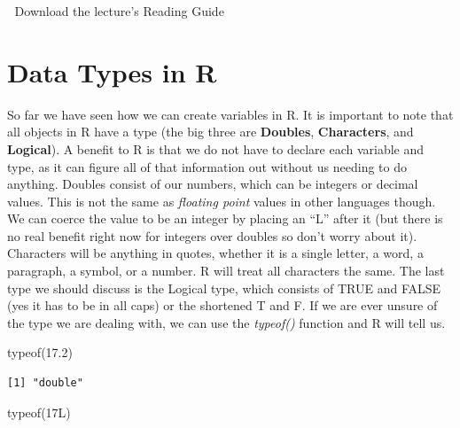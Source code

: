 \documentclass[
  letterpaper,
  DIV=11,
  numbers=noendperiod]{scrreprt}
\newenvironment{Shaded}{\begin{snugshade}}{\end{snugshade}}
\newcommand{\DecValTok}[1]{\textcolor[rgb]{0.68,0.00,0.00}{#1}}
\newcommand{\FloatTok}[1]{\textcolor[rgb]{0.68,0.00,0.00}{#1}}
\newcommand{\FunctionTok}[1]{\textcolor[rgb]{0.28,0.35,0.67}{#1}}
\newcommand{\NormalTok}[1]{\textcolor[rgb]{0.00,0.23,0.31}{#1}}
\begin{document}
\begin{tcolorbox}[enhanced jigsaw, colbacktitle=quarto-callout-tip-color!10!white, breakable, bottomrule=.15mm, colframe=quarto-callout-tip-color-frame, left=2mm, opacitybacktitle=0.6, title=\textcolor{quarto-callout-tip-color}{\faLightbulb}\hspace{0.5em}{Supplemental Material}, leftrule=.75mm, opacityback=0, rightrule=.15mm, titlerule=0mm, bottomtitle=1mm, colback=white, toprule=.15mm, arc=.35mm, toptitle=1mm, coltitle=black]

📄 Download the lecture's Reading Guide

\end{tcolorbox}

\section{Data Types in R}\label{data-types-in-r}

So far we have seen how we can create variables in R. It is important to
note that all objects in R have a type (the big three are
\textbf{Doubles}, \textbf{Characters}, and \textbf{Logical}). A benefit
to R is that we do not have to declare each variable and type, as it can
figure all of that information out without us needing to do anything.
Doubles consist of our numbers, which can be integers or decimal values.
This is not the same as \emph{floating point} values in other languages
though. We can coerce the value to be an integer by placing an ``L''
after it (but there is no real benefit right now for integers over
doubles so don't worry about it). Characters will be anything in quotes,
whether it is a single letter, a word, a paragraph, a symbol, or a
number. R will treat all characters the same. The last type we should
discuss is the Logical type, which consists of TRUE and FALSE (yes it
has to be in all caps) or the shortened T and F. If we are ever unsure
of the type we are dealing with, we can use the \emph{typeof()} function
and R will tell us.

\begin{Shaded}
\begin{Highlighting}[]
\FunctionTok{typeof}\NormalTok{(}\FloatTok{17.2}\NormalTok{)}
\end{Highlighting}
\end{Shaded}

\begin{verbatim}
[1] "double"
\end{verbatim}

\begin{Shaded}
\begin{Highlighting}[]
\FunctionTok{typeof}\NormalTok{(}\DecValTok{17}\NormalTok{L)}
\end{Highlighting}
\end{Shaded}
\end{document}
